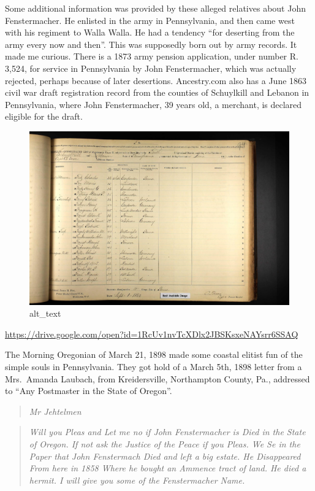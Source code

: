 \documentclass[
  12pt,
]{book}
\begin{document}
Some additional information was provided by these alleged relatives about John Fenstermacher. He enlisted in the army in Pennsylvania, and then came west with his regiment to Walla Walla. He had a tendency ``for deserting from the army every now and then''. This was supposedly born out by army records. It made me curious. There is a 1873 army pension application, under number R. 3,524, for service in Pennsylvania by John Fenstermacher, which was actually rejected, perhaps because of later desertions. Ancestry.com also has a June 1863 civil war draft registration record from the counties of Schuylkill and Lebanon in Pennsylvania, where John Fenstermacher, 39 years old, a merchant, is declared eligible for the draft.

\begin{figure}
\centering
\includegraphics{images/0204b_images/image6.jpg}
\caption{alt\_text}
\end{figure}

\url{https://drive.google.com/open?id=1RcUv1nvTcXDlx2JBSKsxeNAYsrr6SSAQ}

The Morning Oregonian of March 21, 1898 made some coastal elitist fun of the simple souls in Pennsylvania. They got hold of a March 5th, 1898 letter from a Mrs.~Amanda Laubach, from Kreidersville, Northampton County, Pa., addressed to ``Any Postmaster in the State of Oregon''.

\begin{quote}
\emph{Mr Jehtelmen}
\end{quote}

\begin{quote}
\emph{Will you Pleas and Let me no if John Fenstermacher is Died in the State of Oregon. If not ask the Justice of the Peace if you Pleas. We Se in the Paper that John Fenstermach Died and left a big estate. He Disappeared From here in 1858 Where he bought an Ammence tract of land. He died a hermit. I will give you some of the Fenstermacher Name.}
\end{quote}
\end{document}
